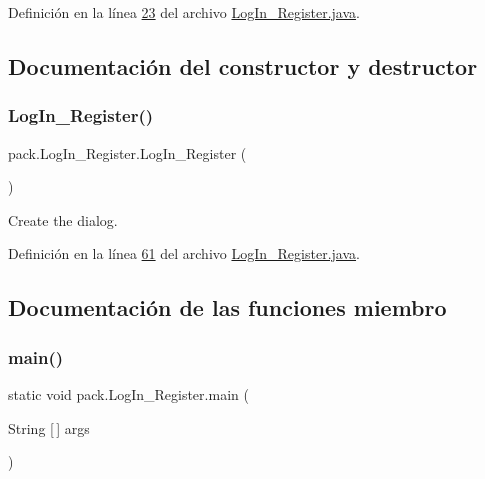 Definición en la línea \mbox{\hyperlink{_log_in___register_8java_source_l00023}{23}} del archivo \mbox{\hyperlink{_log_in___register_8java_source}{Log\+In\+\_\+\+Register.\+java}}.



\subsection{Documentación del constructor y destructor}
\mbox{\label{classpack_1_1_log_in___register_a70dc784075ce952609f2bd5b6ef924dc}} 
\subsubsection{\texorpdfstring{LogIn\_Register()}{LogIn\_Register()}}
{\footnotesize\ttfamily pack.\+Log\+In\+\_\+\+Register.\+Log\+In\+\_\+\+Register (\begin{DoxyParamCaption}{ }\end{DoxyParamCaption})}

Create the dialog. 

Definición en la línea \mbox{\hyperlink{_log_in___register_8java_source_l00061}{61}} del archivo \mbox{\hyperlink{_log_in___register_8java_source}{Log\+In\+\_\+\+Register.\+java}}.



\subsection{Documentación de las funciones miembro}
\mbox{\label{classpack_1_1_log_in___register_ae63739c76a49164c4ff4e7bc0caec8d4}} 
\subsubsection{\texorpdfstring{main()}{main()}}
{\footnotesize\ttfamily static void pack.\+Log\+In\+\_\+\+Register.\+main (\begin{DoxyParamCaption}\item[{String \mbox{[}$\,$\mbox{]}}]{args }\end{DoxyParamCaption})\hspace{0.3cm}{\ttfamily [static]}}

